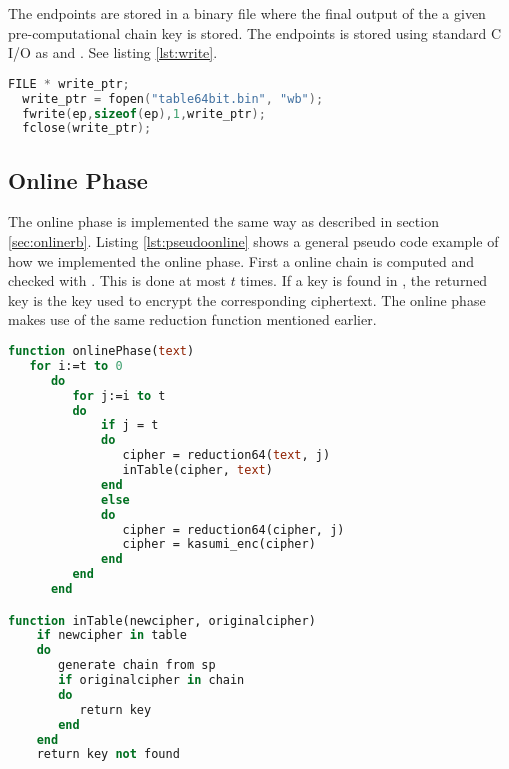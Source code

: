 The endpoints are stored in a binary file where the final output of
the a given pre-computational chain key is stored. The endpoints is stored using standard C
I/O as  and . See listing \ref{lst:write}.
\begin{lstlisting}[frame=single, language=C, mathescape,
captionpos=b, caption={Writing to a binary}, label={lst:write}]
  FILE * write_ptr;
  write_ptr = fopen("table64bit.bin", "wb");
  fwrite(ep,sizeof(ep),1,write_ptr);
  fclose(write_ptr);
\end{lstlisting}

\subsection{Online Phase}
The online phase is implemented the same way as described in section
\ref{sec:onlinerb}. Listing \ref{lst:pseudoonline} shows a general
pseudo code example of how we implemented the online phase. First a
online chain is computed and checked with . This is done
at most $t$ times. If a key is found in , the returned
key is the key used to encrypt the corresponding ciphertext. The online phase
makes use of the same reduction function mentioned earlier.
\newpage
\begin{lstlisting}[frame=single, language=Pascal, mathescape,
captionpos=b, caption={Pseudo code for online phase}, label={lst:pseudoonline}]
function onlinePhase(text)
   for i:=t to 0
      do
         for j:=i to t
         do
             if j = t
             do
                cipher = reduction64(text, j)
                inTable(cipher, text)
             end
             else
             do
                cipher = reduction64(cipher, j)
                cipher = kasumi_enc(cipher)
             end
         end
      end

function inTable(newcipher, originalcipher)
    if newcipher in table
    do
       generate chain from sp
       if originalcipher in chain
       do
          return key
       end
    end
    return key not found
\end{lstlisting}


